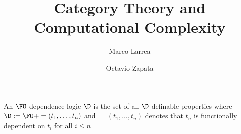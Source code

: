  \usepackage{amsmath, amsthm, amssymb}
 \usepackage[full]{complexity}



\title{Category Theory and \\ Computational Complexity}
\author{Marco Larrea \and Octavio Zapata}


\maketitle

An $\FO$ dependence logic $\D$ is the set of all $\D$-definable properties where $\D := \FO + =(t_1,\dots,t_n)$ and $=(t_1,\dots,t_n)$ denotes that $t_n$ is functionally dependent on $t_{i}$ for all $i\leq n$

\nocite{*}




